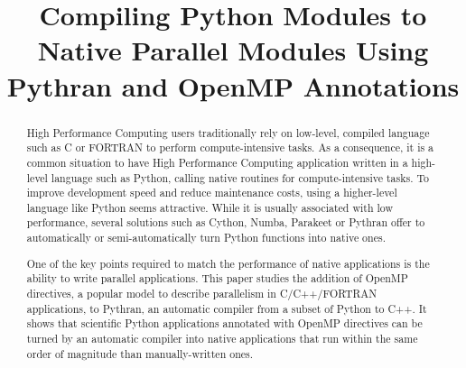 \documentclass[conference]{IEEEtran}
\begin{document}
\renewcommand{\thelstlisting}{\arabic{lstlisting}}
%
\title{Compiling Python Modules to Native Parallel Modules Using Pythran and
OpenMP Annotations}

\author{
    \newline
}

\maketitle

%
\begin{abstract}

    High Performance Computing users traditionally rely on low-level, compiled
    language such as C or FORTRAN to perform compute-intensive tasks. As a
    consequence, it is a common situation to have High Performance Computing
    application written in a high-level language such as Python, calling native
    routines for compute-intensive tasks. To improve development speed and
    reduce maintenance costs, using a higher-level language like Python seems
    attractive. While it is usually associated with low performance, several
    solutions such as Cython, Numba, Parakeet or Pythran offer to automatically
    or semi-automatically turn Python functions into native ones.

    One of the key points required to match the performance of native
    applications is the ability to write parallel applications. This paper
    studies the addition of OpenMP directives, a popular model to describe
    parallelism in C/C++/FORTRAN applications, to Pythran, an automatic compiler
    from a subset of Python to C++. It shows that scientific Python applications
    annotated with OpenMP directives can be turned by an automatic compiler into
    native applications that run within the same order of magnitude than
    manually-written ones.
\end{abstract}
\end{document}
